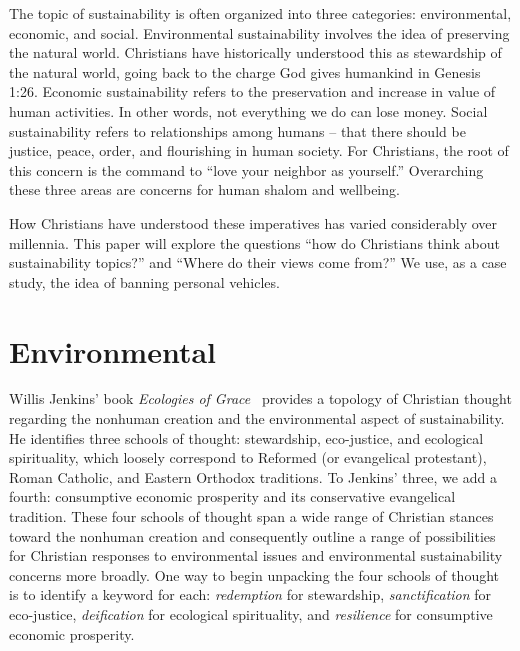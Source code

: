 \documentclass[12pt]{article}
\begin{document}
The topic of sustainability is often organized into three categories: environmental, economic, and
social. Environmental sustainability involves the idea of preserving the natural world.
Christians have historically understood this as stewardship of the natural world, going
back to the charge God gives humankind in Genesis 1:26. Economic sustainability refers to
the preservation and increase in value of human activities. In other words, not everything
we do can lose money. Social sustainability refers to relationships among humans -- that
there should be justice, peace, order, and flourishing in human society. For Christians,
the root of this concern is the command to ``love your neighbor as yourself.'' Overarching
these three areas are concerns for human shalom and wellbeing.

How Christians have understood these imperatives has varied considerably over millennia. 
This paper will explore the questions ``how do Christians think about
sustainability topics?'' and ``Where do their views come from?'' 
We use, as a case study, the idea of banning personal vehicles.



\section{Environmental}
\label{sec:environmental}

Willis Jenkins' book \emph{Ecologies of Grace}~\autocite{Jenkins:2008}
provides a topology of Christian thought regarding the 
nonhuman creation and the
environmental aspect of sustainability.
He identifies three schools of thought:
stewardship, 
eco-justice, and 
ecological spirituality,
which loosely correspond to 
Reformed (or evangelical protestant), 
Roman Catholic, and 
Eastern Orthodox 
traditions.
To Jenkins' three, we add a fourth:
consumptive economic prosperity and
its conservative evangelical tradition. 
These four schools of thought 
span a wide range of Christian stances toward the nonhuman creation
and 
consequently outline a range of possibilities 
for Christian responses to environmental issues
and environmental sustainability concerns more broadly.
One way to begin unpacking the four schools of thought 
is to identify a keyword for each:
\emph{redemption} for stewardship, 
\emph{sanctification} for eco-justice,
\emph{deification} for ecological spirituality, and
\emph{resilience} for consumptive economic prosperity.
\end{document}
